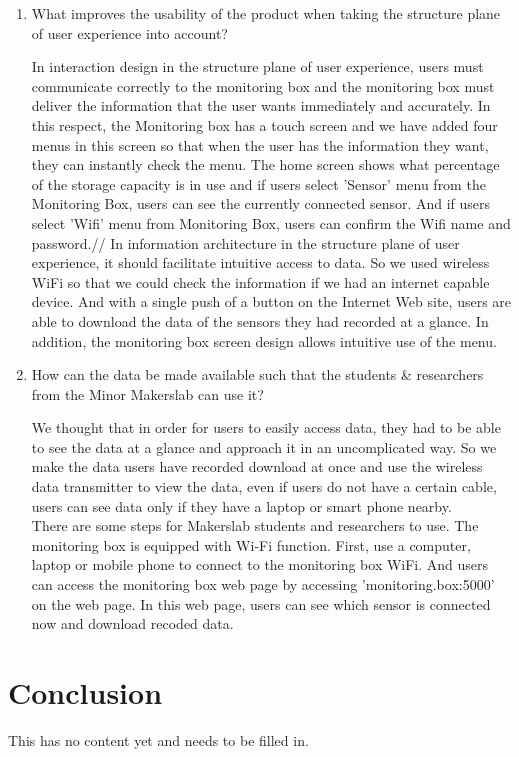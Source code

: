 \documentclass[conference]{IEEEtran}
\begin{document}
\begin{enumerate}
\item What improves the usability of the product when taking the structure plane of user experience into account?

In interaction design in the structure plane of user experience, users must communicate correctly to the monitoring box and the monitoring box must deliver the information that the user wants immediately and accurately. In this respect, the Monitoring box has a touch screen and we have added four menus in this screen so that when the user has the information they want, they can instantly check the menu. The home screen shows what percentage of the storage capacity is in use and if users select 'Sensor' menu from the Monitoring Box, users can see the currently connected sensor. And if users select 'Wifi' menu from Monitoring Box, users can confirm the Wifi name and password.//
In information architecture in the structure plane of user experience, it should facilitate intuitive access to data. So we used wireless WiFi so that we could check the information if we had an internet capable device. And with a single push of a button on the Internet Web site, users are able to download the data of the sensors they had recorded at a glance. In addition, the monitoring box screen design allows intuitive use of the menu.


\item How can the data be made available such that the students \& researchers from the Minor Makerslab can use it?

We thought that in order for users to easily access data, they had to be able to see the data at a glance and approach it in an uncomplicated way. So we make the data users have recorded download at once and use the wireless data transmitter to view the data, even if users do not have a certain cable, users can see data only if they have a laptop or smart phone nearby. \\
There are some steps for Makerslab students and researchers to use. The monitoring box is equipped with Wi-Fi function. First, use a computer, laptop or mobile phone to connect to the monitoring box WiFi. And users can access the monitoring box web page by accessing 'monitoring.box:5000' on the web page. In this web page, users can see which sensor is connected now and download recoded data. 
\end{enumerate}

\section{Conclusion}
This has no content yet and needs to be filled in. 
\end{document}
